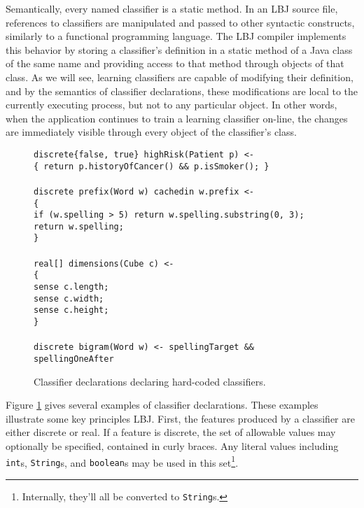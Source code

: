 Semantically, every named classifier is a static method.  In an LBJ source
file, references to classifiers are manipulated and passed to other syntactic
constructs, similarly to a functional programming language.  The LBJ compiler
implements this behavior by storing a classifier's definition in a static
method of a Java class of the same name and providing access to that method
through objects of that class.  As we will see, learning classifiers are
capable of modifying their definition, and by the semantics of classifier
declarations, these modifications are local to the currently executing
process, but not to any particular object.  In other words, when the
application continues to train a learning classifier on-line, the changes are
immediately visible through every object of the classifier's class. \\

\begin{figure}
\begin{center}
\begin{algorithm}
    {\tt discrete\{false, true\} highRisk(Patient p) <-}
\\  {\tt \{ return p.historyOfCancer() \&\& p.isSmoker(); \}}
\\
\\  {\tt discrete prefix(Word w) cachedin w.prefix <-}
\\  {\tt \{} \+
\\  {\tt  if (w.spelling > 5) {\tt return} w.spelling.substring(0, 3);}
\\  {\tt  return w.spelling;} \-
\\  {\tt \}}
\\
\\  {\tt real[] dimensions(Cube c) <-}
\\  {\tt \{} \+
\\  {\tt  sense c.length;}
\\  {\tt  sense c.width;}
\\  {\tt  sense c.height;} \-
\\  {\tt \}}
\\
\\  {\tt discrete bigram(Word w) <- spellingTarget \&\& spellingOneAfter}
\end{algorithm}
\end{center}
\caption{Classifier declarations declaring hard-coded classifiers.}
\label{figure:classifierDeclarations}
\end{figure}

Figure \ref{figure:classifierDeclarations} gives several examples of
classifier declarations.  These examples illustrate some key principles LBJ.
First, the features produced by a classifier are either discrete or real.  If
a feature is discrete, the set of allowable values may optionally be
specified, contained in curly braces.  Any literal values including {\tt
int}s, {\tt String}s, and {\tt boolean}s may be used in this
set\footnote{Internally, they'll all be converted to {\tt String}s.}. \\

